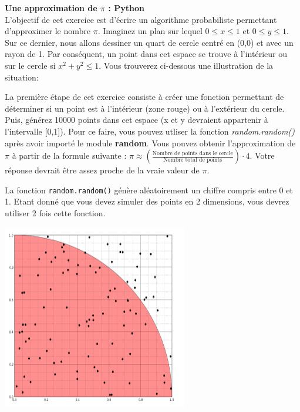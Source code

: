 \begin{Exercice}[15 minutes]\textbf{Une approximation de $\pi$ : Python}\\
    L'objectif de cet exercice est d'écrire un algorithme probabiliste permettant d'approximer le nombre $\pi$. Imaginez un plan sur lequel $0 \leq x \leq 1$ et $0 \leq y \leq 1$. Sur ce dernier, nous allons dessiner un quart de cercle centré en (0,0) et avec un rayon de 1. Par conséquent, un point dans cet espace se trouve à l'intérieur ou sur le cercle si $x^2 + y^2 \leq 1$. Vous trouverez ci-dessous une illustration de la situation:
    
    La première étape de cet exercice consiste à créer une fonction permettant de déterminer si un point est à l'intérieur (zone rouge) ou à l'extérieur du cercle. Puis, générez 10000 points dans cet espace (x et y devraient appartenir à l'intervalle [0,1]). Pour ce faire, vous pouvez utliser la fonction \textit{random.random()} après avoir importé le module \textbf{random}. Vous pouvez obtenir l'approximation de $\pi$ à partir de la formule suivante : $\pi \approx (\frac{\text{Nombre de points dans le cercle}}{\text{Nombre total de points}})\cdot 4$. Votre réponse devrait être assez proche de la vraie valeur de $\pi$.\\
    
    \begin{conseil}
        La fonction \lstinline{random.random()} génère aléatoirement un chiffre compris entre 0 et 1. Etant donné que vous devez simuler des points en 2 dimensions, vous devrez utiliser 2 fois cette fonction.
    \end{conseil}
    \begin{center}
        \includegraphics[]{resources/Cercle.PNG}
    \end{center}
    \begin{solution}
        
    \end{solution}
    
\end{Exercice}
\newpage
